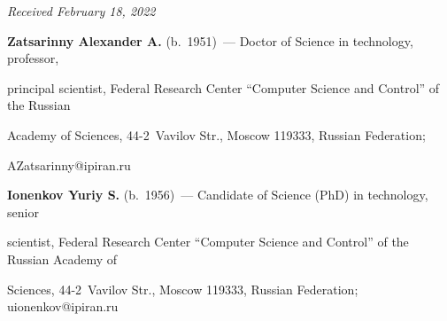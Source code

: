 \vspace*{-3pt}



\hfill{\small\textit{Received February 18, 2022}} 



\vspace*{-14pt} 



\Contr



\vspace*{-3pt}



\noindent

\textbf{Zatsarinny Alexander A.} (b.\ 1951)~--- Doctor of Science in technology, professor, 

principal scientist, Federal Research Center ``Computer Science and Control'' of the Russian 

Academy of Sciences, 44-2~Vavilov Str., Moscow 119333, Russian Federation; 

\mbox{AZatsarinny@ipiran.ru}



\vspace*{3pt}



\noindent

\textbf{Ionenkov Yuriy S.} (b.\ 1956)~--- Candidate of Science (PhD) in technology, senior 

scientist, Federal Research Center ``Computer Science and Control'' of the Russian Academy of 

Sciences, 44-2~Vavilov Str., Moscow 119333, Russian Federation; \mbox{uionenkov@ipiran.ru}





  

 

\label{end\stat}



\renewcommand{\bibname}{\protect\rm Литература} 

